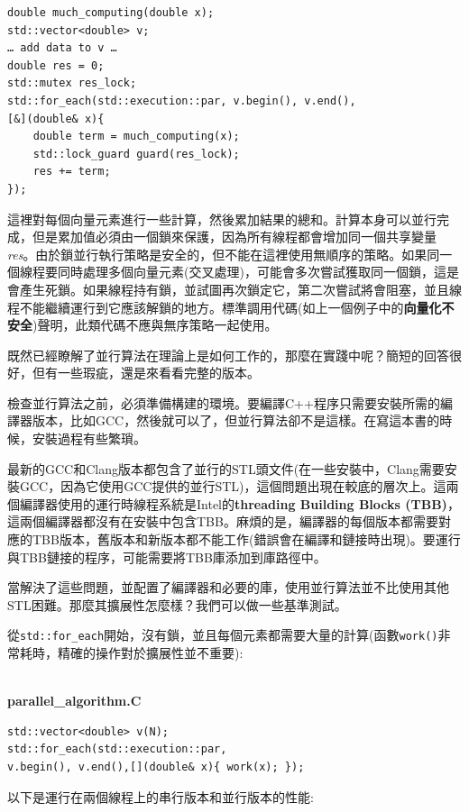 \begin{lstlisting}[style=styleCXX]
double much_computing(double x);
std::vector<double> v;
… add data to v … 
double res = 0;
std::mutex res_lock;
std::for_each(std::execution::par, v.begin(), v.end(),
[&](double& x){ 
	double term = much_computing(x);
	std::lock_guard guard(res_lock);
	res += term;
});
\end{lstlisting}

這裡對每個向量元素進行一些計算，然後累加結果的總和。計算本身可以並行完成，但是累加值必須由一個鎖來保護，因為所有線程都會增加同一個共享變量\textit{res}。由於鎖並行執行策略是安全的，但不能在這裡使用無順序的策略。如果同一個線程要同時處理多個向量元素(交叉處理)，可能會多次嘗試獲取同一個鎖，這是會產生死鎖。如果線程持有鎖，並試圖再次鎖定它，第二次嘗試將會阻塞，並且線程不能繼續運行到它應該解鎖的地方。標準調用代碼(如上一個例子中的\textbf{向量化不安全})聲明，此類代碼不應與無序策略一起使用。 

既然已經瞭解了並行算法在理論上是如何工作的，那麼在實踐中呢？簡短的回答很好，但有一些瑕疵，還是來看看完整的版本。

檢查並行算法之前，必須準備構建的環境。要編譯C++程序只需要安裝所需的編譯器版本，比如GCC，然後就可以了，但並行算法卻不是這樣。在寫這本書的時候，安裝過程有些繁瑣。

最新的GCC和Clang版本都包含了並行的STL頭文件(在一些安裝中，Clang需要安裝GCC，因為它使用GCC提供的並行STL)，這個問題出現在較底的層次上。這兩個編譯器使用的運行時線程系統是Intel的\textbf{threading Building Blocks (TBB)}，這兩個編譯器都沒有在安裝中包含TBB。麻煩的是，編譯器的每個版本都需要對應的TBB版本，舊版本和新版本都不能工作(錯誤會在編譯和鏈接時出現)。要運行與TBB鏈接的程序，可能需要將TBB庫添加到庫路徑中。

當解決了這些問題，並配置了編譯器和必要的庫，使用並行算法並不比使用其他STL困難。那麼其擴展性怎麼樣？我們可以做一些基準測試。 

從\texttt{std::for\_each}開始，沒有鎖，並且每個元素都需要大量的計算(函數\texttt{work()}非常耗時，精確的操作對於擴展性並不重要):

\hspace*{\fill} \\ %
\noindent
\textbf{parallel\_algorithm.C}
\begin{lstlisting}[style=styleCXX]
std::vector<double> v(N);
std::for_each(std::execution::par,
v.begin(), v.end(),[](double& x){ work(x); });
\end{lstlisting}

以下是運行在兩個線程上的串行版本和並行版本的性能:

